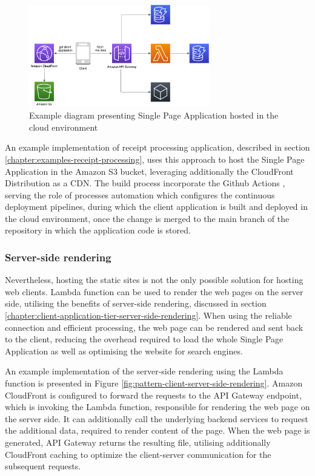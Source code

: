 \begin{figure}[H]
   \centering
   \includegraphics[width=0.7\textwidth]{assets/04-serverless-for-web-apps/hostedClient.png}
   \caption{Example diagram presenting Single Page Application hosted in the cloud environment}
   \label{fig:pattern-client-hosted}
\end{figure}

An example implementation of receipt processing application, described in section \ref{chapter:examples-receipt-processing}, uses this approach to host the Single Page Application in the Amazon S3 bucket, leveraging additionally the CloudFront Distribution as a CDN.
The build process incorporate the Github Actions \cite{GithubAction}, serving the role of processes automation which configures the continuous deployment pipelines, during which the client application is built and deployed in the cloud environment, once the change is merged to the main branch of the repository in which the application code is stored.

\subsubsection{Server-side rendering}

Nevertheless, hosting the static sites is not the only possible solution for hosting web clients.
Lambda function can be used to render the web pages on the server side, utilising the benefits of server-side rendering, discussed in section \ref{chapter:client-application-tier-server-side-rendering}.
When using the reliable connection and efficient processing, the web page can be rendered and sent back to the client, reducing the overhead required to load the whole Single Page Application as well as optimising the website for search engines.

An example implementation of the server-side rendering using the Lambda function is presented in Figure \ref{fig:pattern-client-server-side-rendering}.
Amazon CloudFront is configured to forward the requests to the API Gateway endpoint, which is invoking the Lambda function, responsible for rendering the web page on the server side.
It can additionally call the underlying backend services to request the additional data, required to render content of the page.
When the web page is generated, API Gateway returns the resulting file, utilising additionally CloudFront caching to optimize the client-server communication for the subsequent requests.

